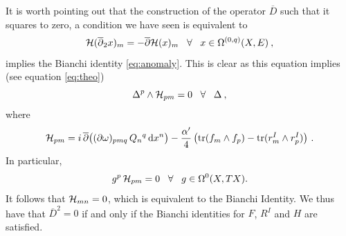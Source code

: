 \documentclass[12pt,a4paper]{article}
\def\bar#1{\overline{#1}}
\let\p=\partial
\def\d{\textrm{d}}
\def\bp{\bar{\partial}}
\def\tr{\textrm{tr}}
\theoremstyle{definition}
\begin{document}
It is worth pointing out that the construction of the operator $\bar D$ such that it squares to zero, 
a condition we have seen is equivalent to 
\begin{equation*}
{\cal H}(\bp_2 x)_m=-\bp{\cal H}(x)_m\;\;\;\forall\;\;\;x\in\Omega^{(0,q)}(X, E)\:,
\end{equation*}
implies the Bianchi identity \eqref{eq:anomaly}.  This is clear as this equation implies (see equation \eqref{eq:theo})
\begin{equation*}
\Delta^p\wedge{\cal H}_{pm}=0\;\;\;\forall\;\;\;\Delta\:,
\end{equation*}
where 
\begin{equation*}
{\cal H}_{pm}=i\, \bp\big((\p\omega)_{pmq}\,Q_n{}^q\, \d x^n\big)
- \frac{\alpha'}{4}\, \big( \tr(f_m\wedge f_p) - \tr (r^I_m\wedge r^I_p)\big)~.
\end{equation*}
In particular, 
\begin{equation*}
g^p\, {\cal H}_{pm} =0\;\;\;\forall\;\;\;g\in\Omega^0(X,TX).
\end{equation*}
It follows that ${\cal H}_{mn}=0$, which is equivalent to the Bianchi Identity. We thus have that $\bar D^2=0$ if and only if the Bianchi identities for $F$, $R^I$ and $H$ are satisfied.
\end{document}
